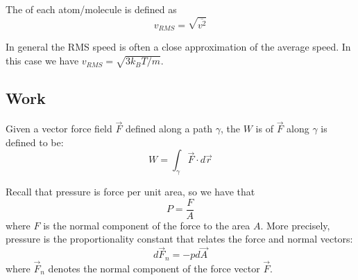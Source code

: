 \documentclass[12pt, a4paper, oneside, openright, titlepage]{book}
\begin{document}
\begin{defn}
    The  of each atom/molecule is defined as \begin{equation*}
        v_{RMS} = \sqrt{\overline{v^2}}
    \end{equation*}
\end{defn}

In general the RMS speed is often a close approximation of the average speed. In this case we have $v_{RMS} = \sqrt{3k_BT/m}$.


\subsection{Work}

\begin{defn}
    Given a vector force field $\vec{F}$ defined along a path $\gamma$, the  $W$ is of $\vec{F}$ along $\gamma$ is defined to be: \begin{equation}
        W = \int_{\gamma}\vec{F}\cdot d\vec{r}
    \end{equation}
\end{defn}

\begin{rec}
    Recall that pressure is force per unit area, so we have that \begin{equation*}
        P = \frac{F}{A}
    \end{equation*}
    where $F$ is the normal component of the force to the area $A$. More precisely, pressure is the proportionality constant that relates the force and normal vectors: \begin{equation*}
        d\vec{F}_n = -pd\vec{A}
    \end{equation*}
    where $\vec{F}_n$ denotes the normal component of the force vector $\vec{F}$.
\end{rec}
\end{document}
